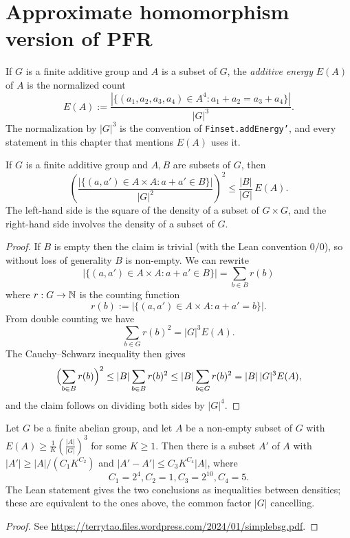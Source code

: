 \chapter{Approximate homomorphism version of PFR}

\begin{definition}
  \label{energy-def}
  \leanok
  If $G$ is a finite additive group and $A$ is a subset of $G$, the \emph{additive energy}
  $E(A)$ of $A$ is the normalized count
  $$ E(A) := \frac{|\{(a_1,a_2,a_3,a_4) \in A^4 : a_1+a_2 = a_3+a_4\}|}{|G|^3}. $$
  The normalization by $|G|^3$ is the convention of \texttt{Finset.addEnergy'}, and every
  statement in this chapter that mentions $E(A)$ uses it.
\end{definition}

\begin{lemma}
  \label{cs-bound}
  \leanok

  If $G$ is a finite additive group and $A,B$ are subsets of $G$, then
  $$ \left( \frac{|\{ (a,a') \in A \times A: a+a' \in B \}|}{|G|^2} \right)^2
     \leq \frac{|B|}{|G|}\, E(A). $$
  The left-hand side is the square of the density of a subset of $G \times G$, and the
  right-hand side involves the density of a subset of $G$.
\end{lemma}
\begin{proof}
  \leanok

  If $B$ is empty then the claim is trivial (with the Lean convention $0/0$),
  so without loss of generality $B$ is non-empty.  We can rewrite
  $$ |\{ (a,a') \in A \times A: a+a' \in B \}| = \sum_{b \in B} r(b)$$
  where $r: G \to \mathbb{N}$ is the counting function
  $$ r(b) := |\{ (a,a') \in A \times A: a+a' = b \}|.$$
  From double counting we have
  $$ \sum_{b \in G} r(b)^2 = |G|^3 E(A).$$
  The Cauchy--Schwarz inequality then gives
  $$ \Bigl( \sum_{b \in B} r(b) \Bigr)^2 \leq |B| \sum_{b \in B} r(b)^2
     \leq |B| \sum_{b \in G} r(b)^2 = |B|\, |G|^3 E(A),$$
  and the claim follows on dividing both sides by $|G|^4$.
\end{proof}

\begin{lemma}
  \label{bsg}
  \leanok

  Let $G$ be a finite abelian group, and let $A$ be a non-empty subset of $G$
  with $E(A) \geq \frac{1}{K} \left( \frac{|A|}{|G|} \right)^3$ for some $K \geq 1$.
  Then there is a subset $A'$ of $A$ with $|A'| \geq |A| / (C_1 K^{C_2})$ and
  $|A'-A'| \leq C_3 K^{C_4} |A|$, where
  $$C_1 = 2^4, C_2 = 1, C_3 = 2^{10}, C_4 = 5.$$
  The Lean statement gives the two conclusions as inequalities between densities; these are
  equivalent to the ones above, the common factor $|G|$ cancelling.
\end{lemma}
\begin{proof}
  \leanok

  See \url{https://terrytao.files.wordpress.com/2024/01/simplebsg.pdf}.
\end{proof}

